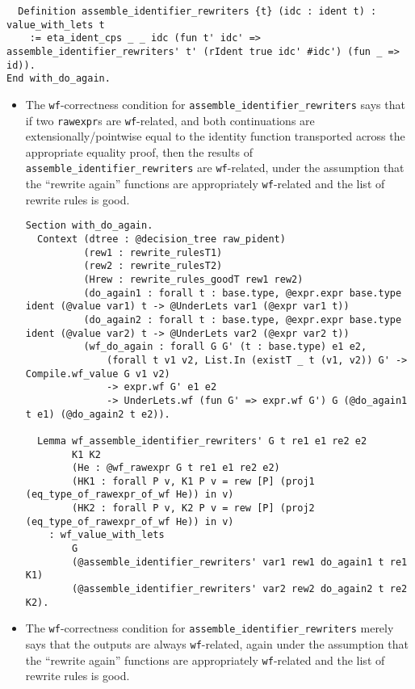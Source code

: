 \begin{itemize}
\begin{itemize}
\begin{verbatim}
  Definition assemble_identifier_rewriters {t} (idc : ident t) : value_with_lets t
    := eta_ident_cps _ _ idc (fun t' idc' => assemble_identifier_rewriters' t' (rIdent true idc' #idc') (fun _ => id)).
End with_do_again.
\end{verbatim}

    \begin{itemize}
    \item
      The \texttt{wf}-correctness condition for
      \texttt{assemble\_identifier\_rewriters\textquotesingle{}} says
      that if two \texttt{rawexpr}s are \texttt{wf}-related, and both
      continuations are extensionally/pointwise equal to the identity
      function transported across the appropriate equality proof, then
      the results of
      \texttt{assemble\_identifier\_rewriters\textquotesingle{}} are
      \texttt{wf}-related, under the assumption that the ``rewrite
      again'' functions are appropriately \texttt{wf}-related and the
      list of rewrite rules is good.

\begin{verbatim}
Section with_do_again.
  Context (dtree : @decision_tree raw_pident)
          (rew1 : rewrite_rulesT1)
          (rew2 : rewrite_rulesT2)
          (Hrew : rewrite_rules_goodT rew1 rew2)
          (do_again1 : forall t : base.type, @expr.expr base.type ident (@value var1) t -> @UnderLets var1 (@expr var1 t))
          (do_again2 : forall t : base.type, @expr.expr base.type ident (@value var2) t -> @UnderLets var2 (@expr var2 t))
          (wf_do_again : forall G G' (t : base.type) e1 e2,
              (forall t v1 v2, List.In (existT _ t (v1, v2)) G' -> Compile.wf_value G v1 v2)
              -> expr.wf G' e1 e2
              -> UnderLets.wf (fun G' => expr.wf G') G (@do_again1 t e1) (@do_again2 t e2)).

  Lemma wf_assemble_identifier_rewriters' G t re1 e1 re2 e2
        K1 K2
        (He : @wf_rawexpr G t re1 e1 re2 e2)
        (HK1 : forall P v, K1 P v = rew [P] (proj1 (eq_type_of_rawexpr_of_wf He)) in v)
        (HK2 : forall P v, K2 P v = rew [P] (proj2 (eq_type_of_rawexpr_of_wf He)) in v)
    : wf_value_with_lets
        G
        (@assemble_identifier_rewriters' var1 rew1 do_again1 t re1 K1)
        (@assemble_identifier_rewriters' var2 rew2 do_again2 t re2 K2).
\end{verbatim}
    \item
      The \texttt{wf}-correctness condition for
      \texttt{assemble\_identifier\_rewriters} merely says that the
      outputs are always \texttt{wf}-related, again under the assumption
      that the ``rewrite again'' functions are appropriately
      \texttt{wf}-related and the list of rewrite rules is good.


\end{itemize}
\end{itemize}
\end{itemize}
